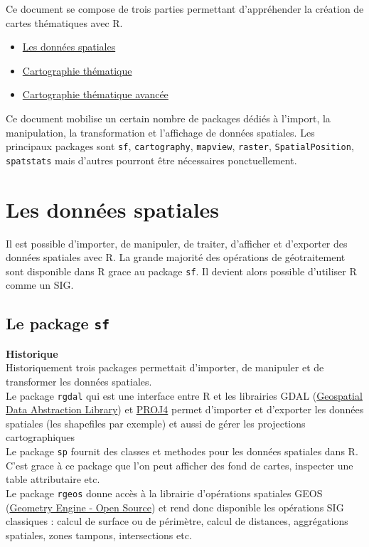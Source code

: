 \documentclass[]{book}
\providecommand{\tightlist}{%
  \setlength{\itemsep}{0pt}\setlength{\parskip}{0pt}}
\begin{document}
Ce document se compose de trois parties permettant d'appréhender la
création de cartes thématiques avec R.

\begin{itemize}
\tightlist
\item
  \protect\hyperlink{jour1}{Les données spatiales}
\item
  \protect\hyperlink{jour2}{Cartographie thématique}\\
\item
  \protect\hyperlink{jour3}{Cartographie thématique avancée}
\end{itemize}

Ce document mobilise un certain nombre de packages dédiés à l'import, la
manipulation, la transformation et l'affichage de données spatiales. Les
principaux packages sont \texttt{sf}, \texttt{cartography},
\texttt{mapview}, \texttt{raster}, \texttt{SpatialPosition},
\texttt{spatstats} mais d'autres pourront être nécessaires
ponctuellement.

\hypertarget{jour1}{\chapter{Les données spatiales}\label{jour1}}

Il est possible d'importer, de manipuler, de traiter, d'afficher et
d'exporter des données spatiales avec R. La grande majorité des
opérations de géotraitement sont disponible dans R grace au package
\texttt{sf}. Il devient alors possible d'utiliser R comme un SIG.

\section{\texorpdfstring{Le package
\texttt{sf}}{Le package sf}}\label{le-package-sf}

\textbf{Historique}\\
Historiquement trois packages permettait d'importer, de manipuler et de
transformer les données spatiales.\\
Le package \texttt{rgdal} qui est une interface entre R et les
librairies GDAL (\href{http://www.gdal.org/}{Geospatial Data Abstraction
Library}) et \href{https://github.com/OSGeo/proj.4}{PROJ4} permet
d'importer et d'exporter les données spatiales (les shapefiles par
exemple) et aussi de gérer les projections cartographiques\\
Le package \texttt{sp} fournit des classes et methodes pour les données
spatiales dans R. C'est grace à ce package que l'on peut afficher des
fond de cartes, inspecter une table attributaire etc.\\
Le package \texttt{rgeos} donne accès à la librairie d'opérations
spatiales GEOS (\href{http://trac.osgeo.org/geos/}{Geometry Engine -
Open Source}) et rend donc disponible les opérations SIG classiques :
calcul de surface ou de périmètre, calcul de distances, aggrégations
spatiales, zones tampons, intersections etc.
\end{document}
